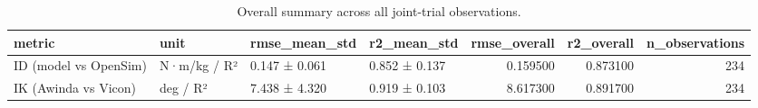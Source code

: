 \begin{table}
\caption{Overall summary across all joint-trial observations.}
\label{tab:table6_overall_summary}
\begin{tabular}{llllrrr}
\toprule
metric & unit & rmse\_mean\_std & r2\_mean\_std & rmse\_overall & r2\_overall & n\_observations \\
\midrule
ID (model vs OpenSim) & N·m/kg / R² & 0.147 ± 0.061 & 0.852 ± 0.137 & 0.159500 & 0.873100 & 234 \\
IK (Awinda vs Vicon) & deg / R² & 7.438 ± 4.320 & 0.919 ± 0.103 & 8.617300 & 0.891700 & 234 \\
\bottomrule
\end{tabular}
\end{table}
